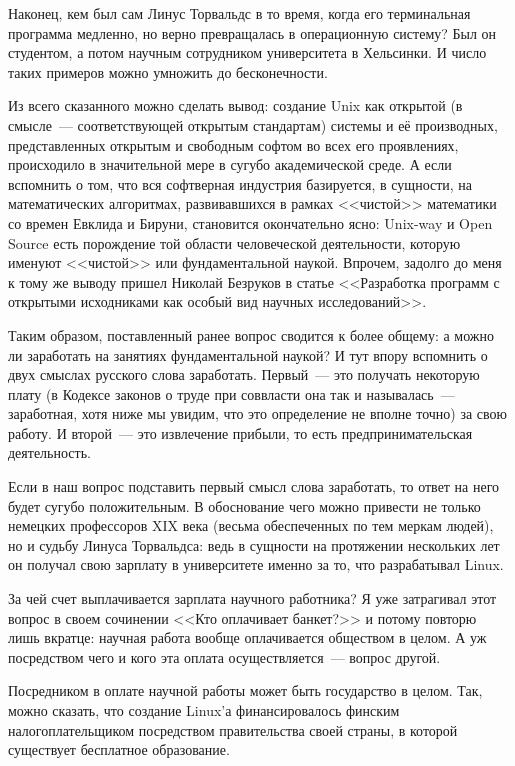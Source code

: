 Наконец, кем был сам Линус Торвальдс в то время, когда его терминальная программа медленно, но верно превращалась в операционную систему? Был он студентом, а потом научным сотрудником университета в Хельсинки. И число таких примеров можно умножить до бесконечности.

Из всего сказанного можно сделать вывод: создание Unix как открытой (в смысле~--- соответствующей открытым стандартам) системы и её производных, представленных открытым и свободным софтом во всех его проявлениях, происходило в значительной мере в сугубо академической среде. А если вспомнить о том, что вся софтверная индустрия базируется, в сущности, на математических алгоритмах, развивавшихся в рамках <<чистой>> математики со времен Евклида и Бируни, становится окончательно ясно: Unix-way и Open Source есть порождение той области человеческой деятельности, которую именуют <<чистой>> или фундаментальной наукой. Впрочем, задолго до меня к тому же выводу пришел Николай Безруков в статье <<Разработка программ с открытыми исходниками как особый вид научных исследований>>.

Таким образом, поставленный ранее вопрос сводится к более общему: а можно ли заработать на занятиях фундаментальной наукой? И тут впору вспомнить о двух смыслах русского слова заработать. Первый~--- это получать некоторую плату (в Кодексе законов о труде при соввласти она так и называлась~--- заработная, хотя ниже мы увидим, что это определение не вполне точно) за свою работу. И второй~--- это извлечение прибыли, то есть предпринимательская деятельность.

Если в наш вопрос подставить первый смысл слова заработать, то ответ на него будет сугубо положительным. В обоснование чего можно привести не только немецких профессоров XIX века (весьма обеспеченных по тем меркам людей), но и судьбу Линуса Торвальдса: ведь в сущности на протяжении нескольких лет он получал свою зарплату в университете именно за то, что разрабатывал Linux.

За чей счет выплачивается зарплата научного работника? Я уже затрагивал этот вопрос в своем сочинении <<Кто оплачивает банкет?>> и потому повторю лишь вкратце: научная работа вообще оплачивается обществом в целом. А уж посредством чего и кого эта оплата осуществляется~--- вопрос другой.

Посредником в оплате научной работы может быть государство в целом. Так, можно сказать, что создание Linux'а финансировалось финским налогоплательщиком посредством правительства своей страны, в которой существует бесплатное образование.

